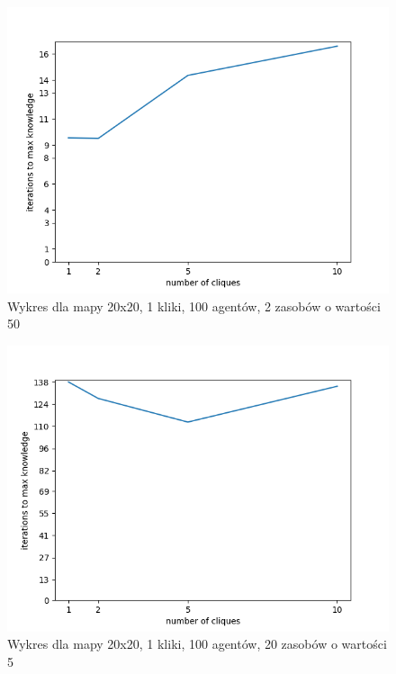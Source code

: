 \begin{figure}[H]
	\centering
	\includegraphics[width=130mm]{wykresy/different_number_of_cliques_map-20x20_graph-1-100_res-2-50_p-1.png}
	\caption{Wykres dla mapy 20x20, 1 kliki, 100 agentów, 2 zasobów o wartości 50}
\end{figure}

\begin{figure}[H]
	\centering
	\includegraphics[width=130mm]{wykresy/different_number_of_cliques_map-20x20_graph-1-100_res-20-5_p-1.png}
	\caption{Wykres dla mapy 20x20, 1 kliki, 100 agentów, 20 zasobów o wartości 5}
\end{figure}

